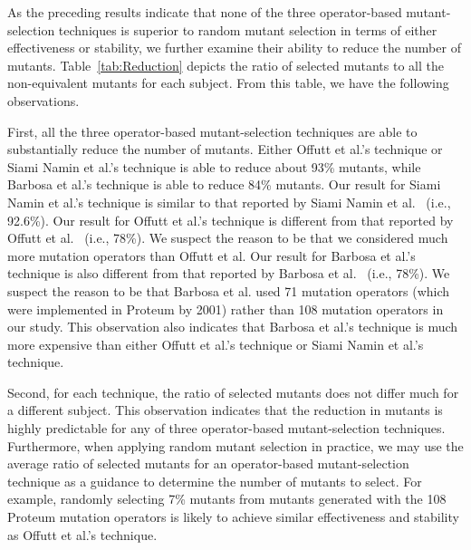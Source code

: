 As the preceding results indicate that none of the three
operator-based mutant-selection techniques is superior to random
mutant selection in terms of either effectiveness or stability, we
further examine their ability to reduce the number of mutants.
Table~\ref{tab:Reduction} depicts the ratio of selected mutants to
all the non-equivalent mutants for each subject. From this table,
we have the following observations.

First, all the three operator-based mutant-selection techniques
are able to substantially reduce the number of mutants. Either
Offutt et al.'s technique or Siami Namin et al.'s technique is
able to reduce about 93\% mutants, while Barbosa et al.'s
technique is able to reduce 84\% mutants. Our result for Siami
Namin et al.'s technique is similar to that reported by Siami
Namin et al.~\cite{SiamiNamin:08} (i.e., 92.6\%). Our result for
Offutt et al.'s technique is different from that reported by
Offutt et al.~\cite{Offutt:96} (i.e., 78\%). We suspect the reason
to be that we considered much more mutation operators than Offutt
et al. Our result for Barbosa et al.'s technique is also different
from that reported by Barbosa et al.~\cite{Barbosa:01} (i.e.,
78\%). We suspect the reason to be that Barbosa et al. used 71
mutation operators (which were implemented in Proteum by 2001)
rather than 108 mutation operators in our study. This observation
also indicates that Barbosa et al.'s technique is much more
expensive than either Offutt et al.'s technique or Siami Namin et
al.'s technique.

Second, for each technique, the ratio of selected mutants does not
differ much for a different subject. This observation indicates
that the reduction in mutants is highly predictable for any of
three operator-based mutant-selection techniques. Furthermore,
when applying random mutant selection in practice, we may use the
average ratio of selected mutants for an operator-based
mutant-selection technique as a guidance to determine the number
of mutants to select. For example, randomly selecting 7\% mutants
from mutants generated with the 108 Proteum mutation operators is
likely to achieve similar effectiveness and stability as Offutt et
al.'s technique.
